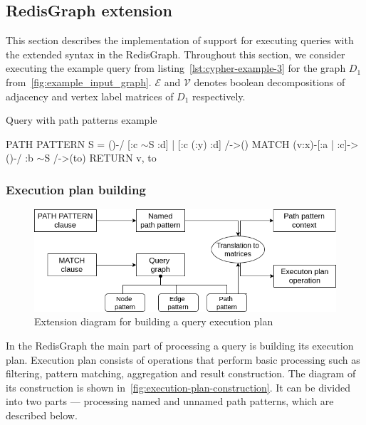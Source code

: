\subsection{RedisGraph extension}
This section describes the implementation of support for executing queries with the extended syntax in the RedisGraph. Throughout this section, we consider executing the example query from listing~\autoref{lst:cypher-example-3} for the graph $D_1$ from~\autoref{fig:example_input_graph}. $\mathcal{E}$ and $\mathcal{V}$ denotes boolean decompositions of adjacency and vertex label matrices of $D_1$ respectively. 

\begin{algorithm}
\begin{algorithmic}[1]
\caption{Query with path patterns example}
\label{lst:cypher-example-3}
\State PATH PATTERN S = ()-/ [:c $\sim$S :d] | [:c (:y) :d] /->()
\State MATCH (v:x)-[:a | :c]->()-/ :b $\sim$S /->(to)
\State RETURN v, to
\end{algorithmic}
\end{algorithm}

\subsubsection{Execution plan building}
\begin{figure}[h]
  \centering
  \includegraphics[width=\linewidth]{execution-plan-building.png}
  \caption{Extension diagram for building a query execution plan}
  \label{fig:execution-plan-construction}
\end{figure}

In the RedisGraph the main part of processing a query is building its execution plan. Execution plan consists of operations that perform basic processing such as filtering, pattern matching, aggregation and result construction. The diagram of its construction is shown in~\autoref{fig:execution-plan-construction}. It can be divided into two parts --- processing named and unnamed path patterns, which are described below.

